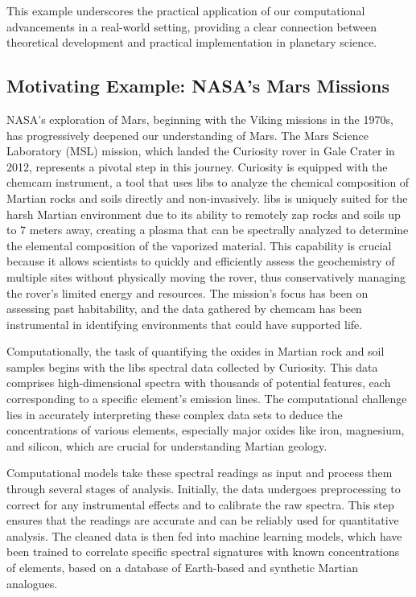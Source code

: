 This example underscores the practical application of our computational advancements in a real-world setting, providing a clear connection between theoretical development and practical implementation in planetary science.




\subsection{Motivating Example: NASA's Mars Missions}

NASA's exploration of Mars, beginning with the Viking missions in the 1970s, has progressively deepened our understanding of Mars. The Mars Science Laboratory (MSL) mission, which landed the Curiosity rover in Gale Crater in 2012, represents a pivotal step in this journey. Curiosity is equipped with the \gls{chemcam} instrument, a tool that uses \gls{libs} to analyze the chemical composition of Martian rocks and soils directly and non-invasively.
\gls{libs} is uniquely suited for the harsh Martian environment due to its ability to remotely zap rocks and soils up to 7 meters away, creating a plasma that can be spectrally analyzed to determine the elemental composition of the vaporized material. This capability is crucial because it allows scientists to quickly and efficiently assess the geochemistry of multiple sites without physically moving the rover, thus conservatively managing the rover's limited energy and resources. The mission's focus has been on assessing past habitability, and the data gathered by \gls{chemcam} has been instrumental in identifying environments that could have supported life.

Computationally, the task of quantifying the oxides in Martian rock and soil samples begins with the \gls{libs} spectral data collected by Curiosity. This data comprises high-dimensional spectra with thousands of potential features, each corresponding to a specific element's emission lines. The computational challenge lies in accurately interpreting these complex data sets to deduce the concentrations of various elements, especially major oxides like iron, magnesium, and silicon, which are crucial for understanding Martian geology.

Computational models take these spectral readings as input and process them through several stages of analysis. Initially, the data undergoes preprocessing to correct for any instrumental effects and to calibrate the raw spectra. This step ensures that the readings are accurate and can be reliably used for quantitative analysis. The cleaned data is then fed into machine learning models, which have been trained to correlate specific spectral signatures with known concentrations of elements, based on a database of Earth-based and synthetic Martian analogues.

